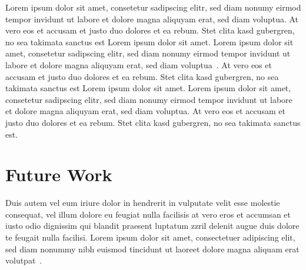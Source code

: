 \documentclass[journal]{vgtc}                %
\begin{document}
Lorem ipsum dolor sit amet, consetetur sadipscing elitr, sed diam
nonumy eirmod tempor invidunt ut labore et dolore magna aliquyam erat,
sed diam voluptua. At vero eos et accusam et justo duo dolores et ea
rebum. Stet clita kasd gubergren, no sea takimata sanctus est Lorem
ipsum dolor sit amet. Lorem ipsum dolor sit amet, consetetur
sadipscing elitr, sed diam nonumy eirmod tempor invidunt ut labore et
dolore magna aliquyam erat, sed diam
voluptua~\cite{Kitware:2003,Max:1995:OMF}. At vero eos et accusam et
justo duo dolores et ea rebum. Stet clita kasd gubergren, no sea
takimata sanctus est Lorem ipsum dolor sit amet. Lorem ipsum dolor sit
amet, consetetur sadipscing elitr, sed diam nonumy eirmod tempor
invidunt ut labore et dolore magna aliquyam erat, sed diam
voluptua. At vero eos et accusam et justo duo dolores et ea
rebum. Stet clita kasd gubergren, no sea takimata sanctus est.

\section{Future Work}

Duis autem vel eum iriure dolor in hendrerit in vulputate velit esse
molestie consequat, vel illum dolore eu feugiat nulla facilisis at
vero eros et accumsan et iusto odio dignissim qui blandit praesent
luptatum zzril delenit augue duis dolore te feugait nulla
facilisi. Lorem ipsum dolor sit amet, consectetuer adipiscing elit,
sed diam nonummy nibh euismod tincidunt ut laoreet dolore magna
aliquam erat volutpat~\cite{Kindlmann:1999:SAG}.



%

%
%
%


\end{document}
